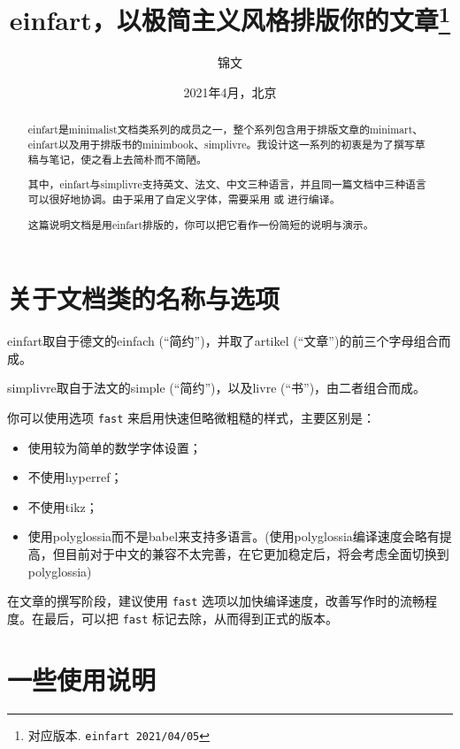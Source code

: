\documentclass{einfart}
\providecommand{\minimalist}{\textsf{minimalist}}
\providecommand{\minimart}{\textsf{minimart}}
\providecommand{\minimbook}{\textsf{minimbook}}
\providecommand{\einfart}{\textsf{einfart}}
\providecommand{\simplivre}{\textsf{simplivre}}
\begin{document}
\title{\einfart{}，以极简主义风格排版你的文章\thanks{对应版本. \texttt{\einfart{} 2021/04/05}}}
\author{锦文}
\date{2021年4月，北京}

\maketitle

\begin{abstract}
    \einfart{}是\minimalist{}文档类系列的成员之一，整个系列包含用于排版文章的\minimart{}、\einfart{}以及用于排版书的\minimbook{}、\simplivre{}。我设计这一系列的初衷是为了撰写草稿与笔记，使之看上去简朴而不简陋。

    其中，\einfart{}与\simplivre{}支持英文、法文、中文三种语言，并且同一篇文档中三种语言可以很好地协调。由于采用了自定义字体，需要采用  或  进行编译。
    
    这篇说明文档是用\einfart{}排版的，你可以把它看作一份简短的说明与演示。
\end{abstract}

\tableofcontents

\section{关于文档类的名称与选项}

\einfart{}取自于德文的einfach (“简约”)，并取了artikel (“文章”)的前三个字母组合而成。

\simplivre{}取自于法文的simple (“简约”)，以及livre (“书”)，由二者组合而成。

你可以使用选项 \verb|fast| 来启用快速但略微粗糙的样式，主要区别是：
\begin{itemize}
    \item 使用较为简单的数学字体设置；
    \item 不使用hyperref；
    \item 不使用tikz；
    \item 使用polyglossia而不是babel来支持多语言。(使用polyglossia编译速度会略有提高，但目前对于中文的兼容不太完善，在它更加稳定后，将会考虑全面切换到polyglossia)
\end{itemize}

在文章的撰写阶段，建议使用 \verb|fast| 选项以加快编译速度，改善写作时的流畅程度。在最后，可以把 \verb|fast| 标记去除，从而得到正式的版本。

\section{一些使用说明}
\end{document}
